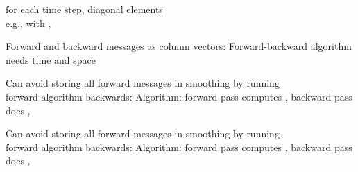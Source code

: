 \documentclass{article}
\begin{document}
\begin{huge}
  for each time step, diagonal elements \\
e.g., with , 

Forward and backward messages as column vectors:
Forward-backward algorithm needs time  and space 


Can avoid storing all forward messages in smoothing by running\\
forward algorithm backwards:
Algorithm: forward pass computes , backward pass does , 

\vspace{0.2in}

\textwidth
{}


Can avoid storing all forward messages in smoothing by running\\
forward algorithm backwards:
Algorithm: forward pass computes , backward pass does , 


\end{huge}
\end{document}

